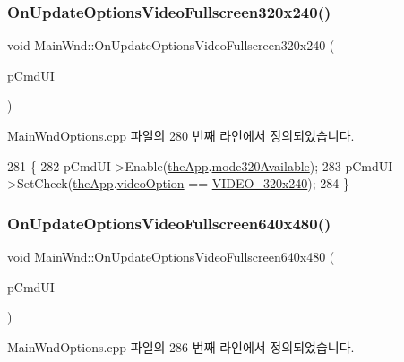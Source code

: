 \subsubsection{\texorpdfstring{On\+Update\+Options\+Video\+Fullscreen320x240()}{OnUpdateOptionsVideoFullscreen320x240()}}
{\footnotesize\ttfamily void Main\+Wnd\+::\+On\+Update\+Options\+Video\+Fullscreen320x240 (\begin{DoxyParamCaption}\item[{C\+Cmd\+UI $\ast$}]{p\+Cmd\+UI }\end{DoxyParamCaption})\hspace{0.3cm}{\ttfamily [protected]}}



Main\+Wnd\+Options.\+cpp 파일의 280 번째 라인에서 정의되었습니다.


\begin{DoxyCode}
281 \{
282   pCmdUI->Enable(\mbox{\hyperlink{_v_b_a_8cpp_a8095a9d06b37a7efe3723f3218ad8fb3}{theApp}}.\mbox{\hyperlink{class_v_b_a_adcefc742bdb15ddb902bcb2df896d298}{mode320Available}});
283   pCmdUI->SetCheck(\mbox{\hyperlink{_v_b_a_8cpp_a8095a9d06b37a7efe3723f3218ad8fb3}{theApp}}.\mbox{\hyperlink{class_v_b_a_a17dac073149c897f770c00ed7098ad32}{videoOption}} == \mbox{\hyperlink{_v_b_a_8h_a531c35e38ede3ea4e5ba5afb24b29493a658665cfbdbd908bdb77babe125d0341}{VIDEO\_320x240}});
284 \}
\end{DoxyCode}
\mbox{\label{class_main_wnd_a464b9ea581a489b94f09f6729041b62c}} 
\subsubsection{\texorpdfstring{On\+Update\+Options\+Video\+Fullscreen640x480()}{OnUpdateOptionsVideoFullscreen640x480()}}
{\footnotesize\ttfamily void Main\+Wnd\+::\+On\+Update\+Options\+Video\+Fullscreen640x480 (\begin{DoxyParamCaption}\item[{C\+Cmd\+UI $\ast$}]{p\+Cmd\+UI }\end{DoxyParamCaption})\hspace{0.3cm}{\ttfamily [protected]}}



Main\+Wnd\+Options.\+cpp 파일의 286 번째 라인에서 정의되었습니다.


